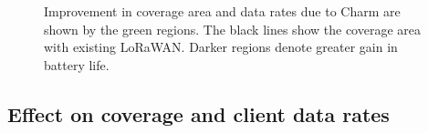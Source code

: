 \begin{figure}[htb]
\centering
{} \hfill
{} \hfill
{}
\compactimg
\caption{Improvement in coverage area and data rates due to Charm are shown by the green regions. The black lines show the coverage area with existing LoRaWAN. Darker regions denote greater gain in battery life.}
\label{fig:charm-improvement}
\compactimg
\end{figure}


\subsection{Effect on coverage and client data rates}
\label{sec:coverage-data-rate-improvement}

